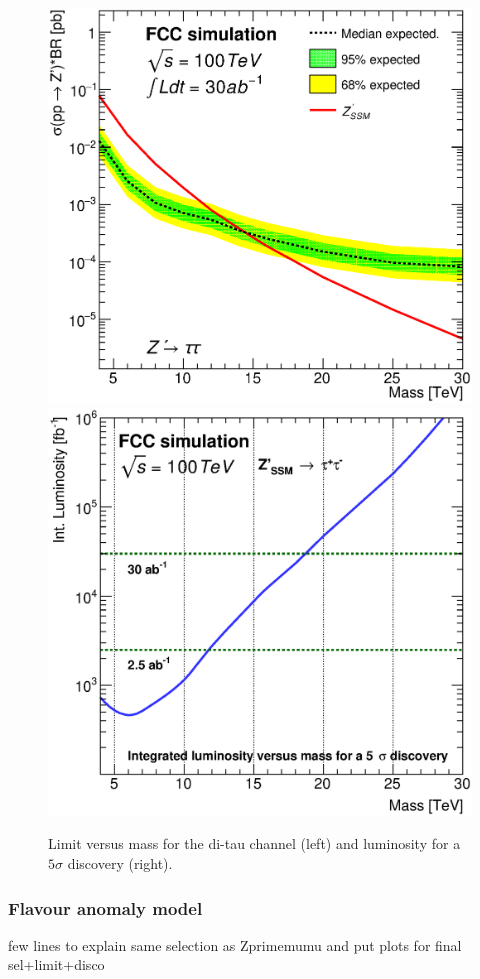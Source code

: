 \documentclass{cernrep}
\begin{document}
\begin{figure}
  \centering
  \includegraphics[width=0.45\columnwidth]{Fig/lim_Zprime_tautau_fcc_v02.eps}
    \includegraphics[width=0.45\columnwidth]{Fig/DiscoveryPotential_tautau_rootStyle.eps}
  \caption{Limit versus mass for the di-tau channel (left) and luminosity for a $5\sigma$ discovery (right). }
  \label{figure:leptonicresonances:resultstautau}
\end{figure}

\subsubsection{Flavour anomaly model}
few lines to explain same selection as Zprimemumu and put plots for final sel+limit+disco
\end{document}
